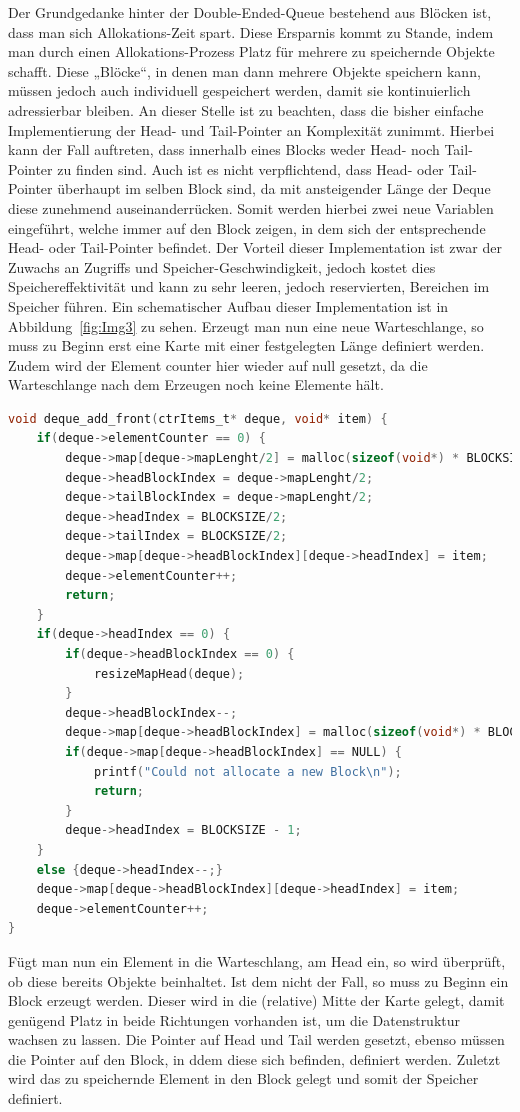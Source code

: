\documentclass{TUBAFarbeiten}
\begin{document}
Der Grundgedanke hinter der Double-Ended-Queue bestehend aus Blöcken ist, dass man sich Allokations-Zeit spart. Diese Ersparnis kommt zu Stande, indem man durch einen Allokations-Prozess Platz für mehrere zu speichernde Objekte schafft. Diese „Blöcke“, in denen man dann mehrere Objekte speichern kann, müssen jedoch auch individuell gespeichert werden, damit sie kontinuierlich adressierbar bleiben. An dieser Stelle ist zu beachten, dass die bisher einfache Implementierung der Head- und Tail-Pointer an Komplexität zunimmt. Hierbei kann der Fall auftreten, dass innerhalb eines Blocks weder Head- noch Tail-Pointer zu finden sind. Auch ist es nicht verpflichtend, dass Head- oder Tail-Pointer überhaupt im selben Block sind, da mit ansteigender Länge der Deque diese zunehmend auseinanderrücken. Somit werden hierbei zwei neue Variablen eingeführt, welche immer auf den Block zeigen, in dem sich der entsprechende Head- oder Tail-Pointer befindet. Der Vorteil dieser Implementation ist zwar der Zuwachs an Zugriffs und Speicher-Geschwindigkeit, jedoch kostet dies Speichereffektivität und kann zu sehr leeren, jedoch reservierten, Bereichen im Speicher führen.
Ein schematischer Aufbau dieser Implementation ist in Abbildung~\ref{fig:Img3} zu sehen. Erzeugt man nun eine neue Warteschlange, so muss zu Beginn erst eine Karte mit einer festgelegten Länge definiert werden. Zudem wird der Element counter hier wieder auf null gesetzt, da die Warteschlange nach dem Erzeugen noch keine Elemente hält. 
\begin{lstlisting}[language=C, frame=single, style=customc]
void deque_add_front(ctrItems_t* deque, void* item) {
    if(deque->elementCounter == 0) {
        deque->map[deque->mapLenght/2] = malloc(sizeof(void*) * BLOCKSIZE);
        deque->headBlockIndex = deque->mapLenght/2;
        deque->tailBlockIndex = deque->mapLenght/2;
        deque->headIndex = BLOCKSIZE/2;
        deque->tailIndex = BLOCKSIZE/2;
        deque->map[deque->headBlockIndex][deque->headIndex] = item;
        deque->elementCounter++;
        return;
    }
    if(deque->headIndex == 0) {
        if(deque->headBlockIndex == 0) {
            resizeMapHead(deque);            
        }
        deque->headBlockIndex--;
        deque->map[deque->headBlockIndex] = malloc(sizeof(void*) * BLOCKSIZE);
        if(deque->map[deque->headBlockIndex] == NULL) {
            printf("Could not allocate a new Block\n");
            return;
        }
        deque->headIndex = BLOCKSIZE - 1;
    }
    else {deque->headIndex--;}
    deque->map[deque->headBlockIndex][deque->headIndex] = item;
    deque->elementCounter++;
}
\end{lstlisting}
Fügt man nun ein Element in die Warteschlang, am Head ein, so wird überprüft, ob diese bereits Objekte beinhaltet. Ist dem nicht der Fall, so muss zu Beginn ein Block erzeugt werden. Dieser wird in die (relative) Mitte der Karte gelegt, damit genügend Platz in beide Richtungen vorhanden ist, um die Datenstruktur wachsen zu lassen. Die Pointer auf Head und Tail werden gesetzt, ebenso müssen die Pointer auf den Block, in ddem diese sich befinden, definiert werden. Zuletzt wird das zu speichernde Element in den Block gelegt und somit der Speicher definiert.\newline
\end{document}
